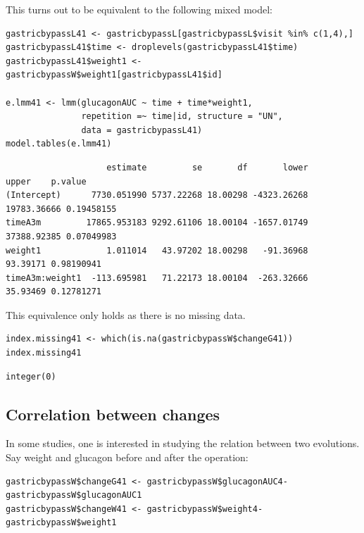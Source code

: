 \documentclass[12pt]{article}
\begin{document}
\clearpage

This turns out to be equivalent to the following mixed model:
\lstset{language=r,label= ,caption= ,captionpos=b,numbers=none}
\begin{lstlisting}
gastricbypassL41 <- gastricbypassL[gastricbypassL$visit %in% c(1,4),]
gastricbypassL41$time <- droplevels(gastricbypassL41$time)
gastricbypassL41$weight1 <- gastricbypassW$weight1[gastricbypassL41$id]

e.lmm41 <- lmm(glucagonAUC ~ time + time*weight1,
               repetition =~ time|id, structure = "UN",
               data = gastricbypassL41)
model.tables(e.lmm41)
\end{lstlisting}

\begin{verbatim}
                    estimate         se       df       lower       upper    p.value
(Intercept)      7730.051990 5737.22268 18.00298 -4323.26268 19783.36666 0.19458155
timeA3m         17865.953183 9292.61106 18.00104 -1657.01749 37388.92385 0.07049983
weight1             1.011014   43.97202 18.00298   -91.36968    93.39171 0.98190941
timeA3m:weight1  -113.695981   71.22173 18.00104  -263.32666    35.93469 0.12781271
\end{verbatim}


This equivalence only holds as there is no missing data.
\lstset{language=r,label= ,caption= ,captionpos=b,numbers=none}
\begin{lstlisting}
index.missing41 <- which(is.na(gastricbypassW$changeG41))
index.missing41
\end{lstlisting}

\begin{verbatim}
integer(0)
\end{verbatim}

\subsection{Correlation between changes}
\label{sec:orgf8a6238}

In some studies, one is interested in studying the relation between
two evolutions. Say weight and glucagon before and after the
operation:
\lstset{language=r,label= ,caption= ,captionpos=b,numbers=none}
\begin{lstlisting}
gastricbypassW$changeG41 <- gastricbypassW$glucagonAUC4-gastricbypassW$glucagonAUC1
gastricbypassW$changeW41 <- gastricbypassW$weight4-gastricbypassW$weight1
\end{lstlisting}
\end{document}
